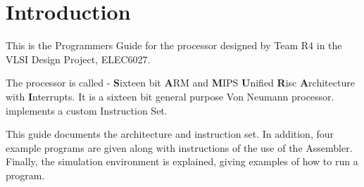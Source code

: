 
\section{Introduction}


This is the Programmers Guide for the processor designed by Team R4 in the VLSI Design Project, ELEC6027. 

The processor is called \samurai{} - \textbf{S}ixteen bit \textbf{A}RM and \textbf{M}IPS \textbf{U}nified \textbf{R}isc \textbf{A}rchitecture with \textbf{I}nterrupts.
It is a sixteen bit general purpose Von Neumann processor. 
\samurai{} implements a custom Instruction Set. 

This guide documents the architecture and instruction set. 
In addition, four example programs are given along with instructions of the use of the Assembler. 
Finally, the simulation environment is explained, giving examples of how to run a program. 
